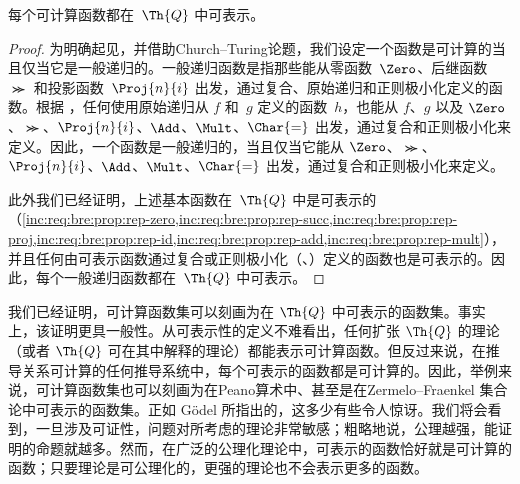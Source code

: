 \documentclass[../../../include/open-logic-section]{subfiles}
\begin{document}

\begin{thm}
每个可计算函数都在~$\Th{Q}$ 中可表示。
\end{thm}

\begin{proof}
为明确起见，并借助Church--Turing论题，我们设定一个函数是可计算的当且仅当它是一般递归的。一般递归函数是指那些能从零函数~$\Zero$、后继函数~$\Succ$ 和投影函数~$\Proj{n}{i}$ 出发，通过复合、原始递归和正则极小化定义的函数。根据 ，任何使用原始递归从 $f$ 和~$g$ 定义的函数~$h$，也能从 $f$、$g$ 以及 $\Zero$、$\Succ$、$\Proj{n}{i}$、$\Add$、$\Mult$、$\Char{=}$ 出发，通过复合和正则极小化来定义。因此，一个函数是一般递归的，当且仅当它能从 $\Zero$、$\Succ$、$\Proj{n}{i}$、$\Add$、$\Mult$、$\Char{=}$ 出发，通过复合和正则极小化来定义。

此外我们已经证明，上述基本函数在~$\Th{Q}$ 中是可表示的（\cref{inc:req:bre:prop:rep-zero,inc:req:bre:prop:rep-succ,inc:req:bre:prop:rep-proj,inc:req:bre:prop:rep-id,inc:req:bre:prop:rep-add,inc:req:bre:prop:rep-mult}），并且任何由可表示函数通过复合或正则极小化（、）定义的函数也是可表示的。因此，每个一般递归函数都在~$\Th{Q}$ 中可表示。
\end{proof}

\begin{explain}
我们已经证明，可计算函数集可以刻画为在 $\Th{Q}$ 中可表示的函数集。事实上，该证明更具一般性。从可表示性的定义不难看出，任何扩张 $\Th{Q}$ 的理论（或者 $\Th{Q}$ 可在其中解释的理论）都能表示可计算函数。但反过来说，在推导关系可计算的任何推导系统中，每个可表示的函数都是可计算的。因此，举例来说，可计算函数集也可以刻画为在Peano算术中、甚至是在Zermelo--Fraenkel 集合论中可表示的函数集。正如 Gödel 所指出的，这多少有些令人惊讶。我们将会看到，一旦涉及可证性，问题对所考虑的理论非常敏感；粗略地说，公理越强，能证明的命题就越多。然而，在广泛的公理化理论中，可表示的函数恰好就是可计算的函数；只要理论是可公理化的，更强的理论也不会表示更多的函数。
\end{explain}
\end{document}
